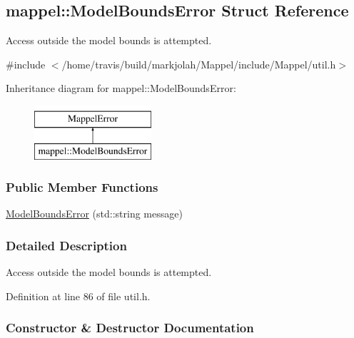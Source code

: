 \hypertarget{structmappel_1_1ModelBoundsError}{}\subsection{mappel\+:\+:Model\+Bounds\+Error Struct Reference}
\label{structmappel_1_1ModelBoundsError}


Access outside the model bounds is attempted.  




{\ttfamily \#include $<$/home/travis/build/markjolah/\+Mappel/include/\+Mappel/util.\+h$>$}

Inheritance diagram for mappel\+:\+:Model\+Bounds\+Error\+:\begin{figure}[H]
\begin{center}
\leavevmode
\includegraphics[height=2.000000cm]{structmappel_1_1ModelBoundsError}
\end{center}
\end{figure}
\subsubsection*{Public Member Functions}
\begin{DoxyCompactItemize}
\item 
\hyperlink{structmappel_1_1ModelBoundsError_aa5da32648cddf0c1bfc9b59c32531e09}{Model\+Bounds\+Error} (std\+::string message)
\end{DoxyCompactItemize}


\subsubsection{Detailed Description}
Access outside the model bounds is attempted. 

Definition at line 86 of file util.\+h.



\subsubsection{Constructor \& Destructor Documentation}
